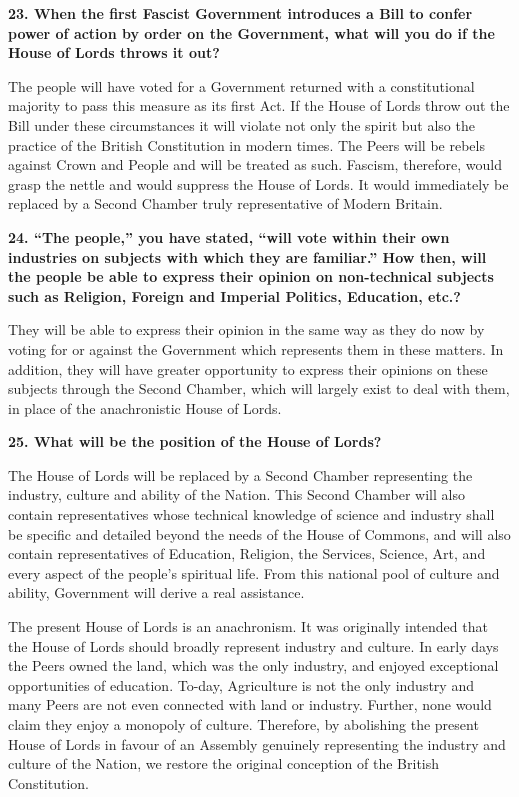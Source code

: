 \documentclass{book}
\begin{document}
\begin{flushright}
\textbf{23. When the first Fascist Government introduces a Bill to confer power of action by order
    on the Government, what will you do if the House of Lords throws it out?}

The people will have voted for a Government returned with a constitutional majority to pass this
measure as its first Act. If the House of Lords throw out the Bill under these circumstances it will
violate not only the spirit but also the practice of the British Constitution in modern times. The
Peers will be rebels against Crown and People and will be treated as such. Fascism, therefore,
would grasp the nettle and would suppress the House of Lords. It would immediately be replaced
by a Second Chamber truly representative of Modern Britain.
\end{flushright}

\begin{flushleft}
\textbf{24. ``The people,'' you have stated, ``will vote within their own industries on subjects with
which they are familiar.'' How then, will the people be able to express their opinion on
non-technical subjects such as Religion, Foreign and Imperial Politics, Education, etc.? }

They will be able to express their opinion in the same way as they do now by voting for or
against the Government which represents them in these matters. In addition, they will have
greater opportunity to express their opinions on these subjects through the Second Chamber,
which will largely exist to deal with them, in place of the anachronistic House of Lords.
\end{flushleft}

\begin{flushright}
\textbf{25. What will be the position of the House of Lords?}

The House of Lords will be replaced by a Second Chamber representing the industry, culture and
ability of the Nation. This Second Chamber will also contain representatives whose technical
knowledge of science and industry shall be specific and detailed beyond the needs of the House
of Commons, and will also contain representatives of Education, Religion, the Services, Science,
Art, and every aspect of the people's spiritual life. From this national pool of culture and ability, Government will derive a real assistance.

The present House of Lords is an anachronism. It was originally intended that the House of
Lords should broadly represent industry and culture. In early days the Peers owned the land,
which was the only industry, and enjoyed exceptional opportunities of education. To-day,
Agriculture is not the only industry and many Peers are not even connected with land or industry.
Further, none would claim they enjoy a monopoly of culture. Therefore, by abolishing the
present House of Lords in favour of an Assembly genuinely representing the industry and culture of the Nation, we restore the original
conception of the British Constitution.
\end{flushright}
\end{document}
